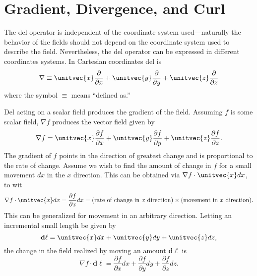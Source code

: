 \section{Gradient, Divergence, and Curl}

The del operator is independent of the coordinate system
used---naturally the behavior of the fields should not depend on the
coordinate system used to describe the field.  Nevertheless, the del
operator can be expressed in different coordinates systems.  In
Cartesian coordinates del is
\begin{equation}
  \nabla \equiv \unitvec{x} \frac{\partial}{\partial x} +
                \unitvec{y} \frac{\partial}{\partial y} +
                \unitvec{z} \frac{\partial}{\partial z}
\end{equation}
where the symbol $\equiv$ means ``defined as.''

Del acting on a scalar field produces the gradient of the field.
Assuming $f$ is some scalar field, $\nabla f$ produces the vector
field given by 
\begin{equation}
  \nabla f = \unitvec{x} \frac{\partial f}{\partial x} +
             \unitvec{y} \frac{\partial f}{\partial y} +
             \unitvec{z} \frac{\partial f}{\partial z}.
\end{equation}
The gradient of $f$ points in the direction of greatest change and is
proportional to the rate of change.  Assume we wish to find the amount
of change in $f$ for a small movement $dx$ in the $x$ direction.  This
can be obtained via $\nabla f \cdot \unitvec{x} dx$, to wit
\begin{equation}
  \nabla f \cdot \unitvec{x} dx = \frac{\partial f}{\partial x} dx
    = \mbox{(rate of change in $x$ direction)}\times
      \mbox{(movement in $x$ direction)}.
\end{equation}
This can be generalized for movement in an arbitrary direction.
Letting an incremental small length be given by
\begin{equation}
  \mathbf{d\ell} = \unitvec{x} dx + \unitvec{y} dy + \unitvec{z} dz,
\end{equation}
the change in the field realized by moving an amount $\mathbf{d\ell}$
is
\begin{equation}
  \nabla f\cdot\mathbf{d\ell} = 
     \frac{\partial f}{\partial x} dx +
     \frac{\partial f}{\partial y} dy +
     \frac{\partial f}{\partial z} dz.
\end{equation}

